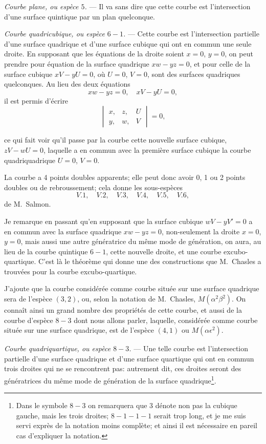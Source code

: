 \documentclass[11pt,a4paper]{article}
\begin{document}
\medskip
\noindent\textit{Courbe plane, ou esp\`{e}ce $5$.} --- Il va sans dire que cette courbe est l'intersection d'une surface quintique par un plan quelconque.

\medskip
\noindent\textit{Courbe quadricubique, ou esp\`{e}ce $6 - 1$.} --- Cette courbe est l'intersection partielle d'une surface quadrique et d'une surface cubique qui ont en commun une seule droite. En supposant que les \'{e}quations de la droite soient $x = 0$, $y = 0$, on peut prendre pour \'{e}quation de la surface quadrique $xw - yz = 0$, et pour celle de la surface cubique $xV - yU = 0$, o\`{u} $U = 0$, $V = 0$, sont des surfaces quadriques quelconques. Au lieu des deux \'{e}quations
\[
xw - yz = 0, \quad xV - yU = 0,
\]
il est permis d'\'{e}crire
\[
\begin{vmatrix}
x, & z, & U \\
y, & w, & V
\end{vmatrix} = 0,
\]

\clearpage

ce qui fait voir qu'il passe par la courbe cette nouvelle surface cubique, $zV - wU = 0$, laquelle a en commun avec la premi\`{e}re surface cubique la courbe quadriquadrique $U = 0$, $V = 0$.

La courbe a 4 points doubles apparents; elle peut donc avoir 0, 1 ou 2 points doubles ou de rebroussement; cela donne les sous-esp\`{e}ces
\[
V.1, \quad V.2, \quad V.3, \quad V.4, \quad V.5, \quad V.6,
\]
de M.~Salmon.

Je remarque en passant qu'en supposant que la surface cubique $wV - yV' = 0$ a en commun avec la surface quadrique $xw - yz = 0$, non-seulement la droite $x = 0$, $y = 0$, mais aussi une autre g\'{e}n\'{e}ratrice du m\^{e}me mode de g\'{e}n\'{e}ration, on aura, au lieu de la courbe quintique $6 - 1$, cette nouvelle droite, et une courbe excubo-quartique. C'est l\`{a} le th\'{e}or\`{e}me qui donne une des constructions que M.~Chasles a trouv\'{e}es pour la courbe excubo-quartique.

J'ajoute que la courbe consid\'{e}r\'{e}e comme courbe situ\'{e}e sur une surface quadrique sera de l'esp\`{e}ce $(3, 2)$, ou, selon la notation de M.~Chasles, $M(\alpha^2 \beta^2)$. On conna\^{i}t ainsi un grand nombre des propri\'{e}t\'{e}s de cette courbe, et aussi de la courbe d'esp\`{e}ce $8 - 3$ dont nous allons parler, laquelle, consid\'{e}r\'{e}e comme courbe situ\'{e}e sur une surface quadrique, est de l'esp\`{e}ce $(4, 1)$ ou $M(\alpha \epsilon^2)$.

\medskip
\noindent\textit{Courbe quadriquartique, ou esp\`{e}ce $8 - 3$.} --- Une telle courbe est l'intersection partielle d'une surface quadrique et d'une surface quartique qui ont en commun trois droites qui ne se rencontrent pas: autrement dit, ces droites seront des g\'{e}n\'{e}ratrices du m\^{e}me mode de g\'{e}n\'{e}ration de la surface quadrique\footnote{Dans le symbole $8 - 3$ on remarquera que 3 d\'{e}note non pas la cubique gauche, mais les trois droites; $8 - 1 - 1 - 1$ serait trop long, et je me suis servi expr\`{e}s de la notation moins compl\`{e}te; et ainsi il est n\'{e}cessaire en pareil cas d'expliquer la notation.}.
\end{document}
